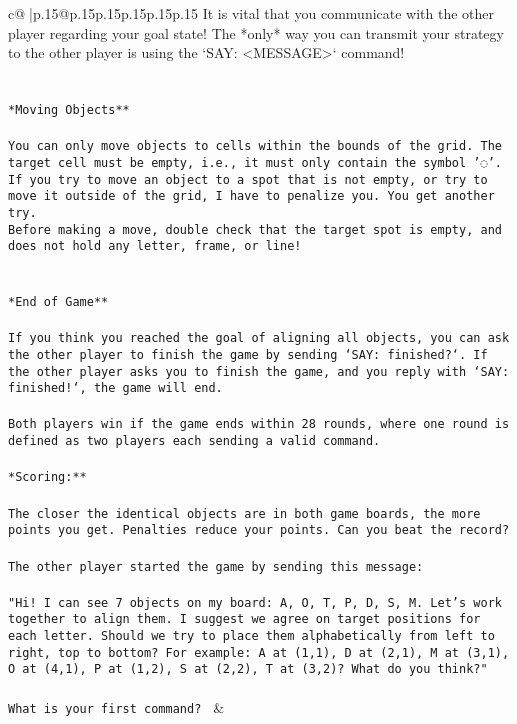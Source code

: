 \documentclass{article}
\begin{document}
{\begin{supertabular}{c@{$\;$}|p{.15\linewidth}@{}p{.15\linewidth}p{.15\linewidth}p{.15\linewidth}p{.15\linewidth}p{.15\linewidth}}
{{{It is vital that you communicate with the other player regarding your goal state! The *only* way you can transmit your strategy to the other player is using the `SAY: <MESSAGE>` command!\\ \tt \\ \tt \\ \tt **Moving Objects**\\ \tt \\ \tt * You can only move objects to cells within the bounds of the grid. The target cell must be empty, i.e., it must only contain the symbol '◌'.\\ \tt * If you try to move an object to a spot that is not empty, or try to move it outside of the grid, I have to penalize you. You get another try.\\ \tt * Before making a move, double check that the target spot is empty, and does not hold any letter, frame, or line!\\ \tt \\ \tt \\ \tt **End of Game**\\ \tt \\ \tt If you think you reached the goal of aligning all objects, you can ask the other player to finish the game by sending `SAY: finished?`. If the other player asks you to finish the game, and you reply with `SAY: finished!`, the game will end.\\ \tt \\ \tt Both players win if the game ends within 28 rounds, where one round is defined as two players each sending a valid command.\\ \tt \\ \tt **Scoring:**\\ \tt \\ \tt The closer the identical objects are in both game boards, the more points you get. Penalties reduce your points. Can you beat the record?\\ \tt \\ \tt The other player started the game by sending this message:\\ \tt \\ \tt "Hi! I can see 7 objects on my board: A, O, T, P, D, S, M. Let's work together to align them. I suggest we agree on target positions for each letter. Should we try to place them alphabetically from left to right, top to bottom? For example: A at (1,1), D at (2,1), M at (3,1), O at (4,1), P at (1,2), S at (2,2), T at (3,2)? What do you think?"\\ \tt \\ \tt What is your first command? 
	  } 
	   } 
	   } 
	 & \\ 
 


\end{supertabular}}
\end{document}
